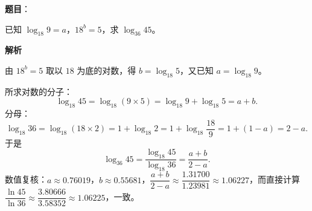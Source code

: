 \begin{answer}

\textbf{题目}：

已知 $\log_{18}9=a$，$18^b=5$，求 $\log_{36}45$。

\textbf{解析}

由 $18^b=5$ 取以 $18$ 为底的对数，得 $b=\log_{18}5$，又已知 $a=\log_{18}9$。

所求对数的分子：
\nopagebreak[4]
\[
\log_{18}45=\log_{18}(9\times5)=\log_{18}9+\log_{18}5=a+b.
\]
分母：
\nopagebreak[4]
\[
\log_{18}36=\log_{18}(18\times2)=1+\log_{18}2=1+\log_{18}\frac{18}{9}=1+(1-a)=2-a.
\]
于是
\nopagebreak[4]
\[
\log_{36}45=\frac{\log_{18}45}{\log_{18}36}=\frac{a+b}{2-a}.
\]
数值复核：$a\approx0.76019$，$b\approx0.55681$，$\dfrac{a+b}{2-a}\approx\dfrac{1.31700}{1.23981}\approx1.06227$，而直接计算 $\dfrac{\ln45}{\ln36}\approx\dfrac{3.80666}{3.58352}\approx1.06225$，一致。


\end{answer}

